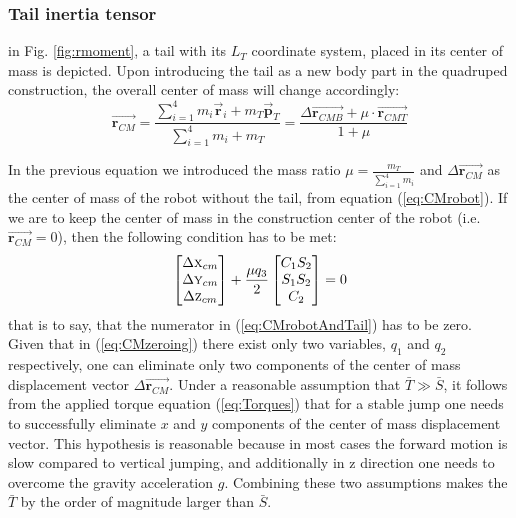 \subsubsection{Tail inertia tensor}
in Fig. \ref{fig:rmoment}, a tail with its ${L_T}$ coordinate system, placed in its center of mass is depicted. Upon introducing the tail as a new body part in the quadruped construction, the overall center of mass will change accordingly:
\begin{equation}\label{eq:CMrobotAndTail}
\vec{\textbf{r}_{CM}}=\frac{\sum_{i=1}^{4}m_i\vec{\textbf{r}}_i+m_T\vec{\textbf{p}}_T}{\sum_{i=1}^{4}m_i+m_T}= \frac{\Delta\vec{\textbf{r}_{CMB}}+\mu\cdot\vec{\textbf{r}_{CMT}}}{1+\mu}
\end{equation}


In the previous equation we introduced the mass ratio $\mu=\frac{m_T}{\sum_{i=1}^{4}m_i}$ and $\Delta\vec{\textbf{r}_{CM}}$ as the center of mass of the robot without the tail, from equation (\ref{eq:CMrobot}). If we are to keep the center of mass in the construction center of the robot (i.e. $\vec{\textbf{r}_{CM}}=0$), then the following condition has to be met:
\begin{equation}\label{eq:CMzeroing}
\begin{bmatrix}
\Delta \textsc{x}_{cm}\\ 
\Delta \textsc{y}_{cm}\\ 
\Delta \textsc{z}_{cm}
\end{bmatrix}+
\frac{\mu q_3}{2}\begin{bmatrix}
C_1S_2\\ 
S_1S_2\\ 
C_2
\end{bmatrix}=0
\end{equation}
that is to say, that the numerator in (\ref{eq:CMrobotAndTail}) has to be zero. Given that in (\ref{eq:CMzeroing}) there exist only two variables, $q_1$ and $q_2$ respectively, one can eliminate only two components of the center of mass displacement vector $\Delta \vec{\textbf{r}_{CM}}$. Under a reasonable assumption that $\bar{T}\gg \bar{S}$, it follows from the applied torque equation (\ref{eq:Torques}) that for a stable jump one needs to successfully eliminate $x$ and $y$ components of the center of mass displacement vector. This hypothesis is reasonable because in most cases the forward motion is slow compared to vertical jumping, and additionally in z direction one needs to overcome the gravity acceleration $g$. Combining these two assumptions makes the $\bar{T}$ by the order of magnitude larger than $\bar{S}$.

